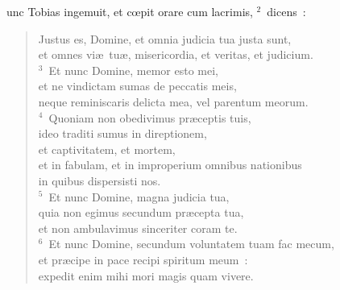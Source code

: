 \bchapter
{}unc Tobias ingemuit, et cœpit orare cum lacrimis,
${}^{2}$~dicens~: \begin{verse}Justus es, Domine, et omnia judicia tua justa sunt,\\ et omnes vi\ae\ tu\ae , misericordia, et veritas, et judicium.\\
${}^{3}$~Et nunc Domine, memor esto mei,\\ et ne vindictam sumas de peccatis meis,\\ neque reminiscaris delicta mea, vel parentum meorum.\\
${}^{4}$~Quoniam non obedivimus pr\ae ceptis tuis,\\ ideo traditi sumus in direptionem,\\ et captivitatem, et mortem,\\ et in fabulam, et in improperium omnibus nationibus\\ in quibus dispersisti nos.\\
${}^{5}$~Et nunc Domine, magna judicia tua,\\ quia non egimus secundum pr\ae cepta tua,\\ et non ambulavimus sinceriter coram te.\\
${}^{6}$~Et nunc Domine, secundum voluntatem tuam fac mecum,\\ et pr\ae cipe in pace recipi spiritum meum~:\\ expedit enim mihi mori magis quam vivere.\end{verse}


